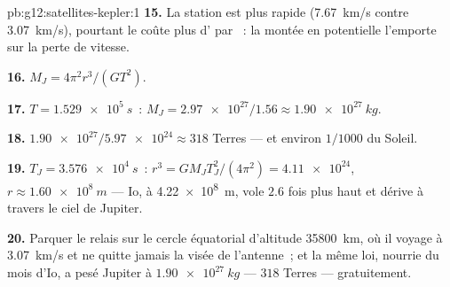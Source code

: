 \begin{solution}{pb:g12:satellites-kepler:1}
\textbf{15.} La station est plus rapide (\qty{7.67}{km/s} contre
\qty{3.07}{km/s}), pourtant le  coûte plus
d' par ~: la montée en
 potentielle l'emporte sur la perte de vitesse.

\textbf{16.} $M_J = 4\pi^2 r^3/(G T^2)$.

\textbf{17.} $T = \qty{1.529e5}{s}$~: $M_J =
\num{2.97e27}/1.56 \approx \qty{1.90e27}{kg}$.

\textbf{18.} $\num{1.90e27}/\num{5.97e24} \approx 318$ Terres ---
et environ $1/1000$ du Soleil.

\textbf{19.} $T_J = \qty{3.576e4}{s}$~: $r^3 = GM_J T_J^2/(4\pi^2) =
\num{4.11e24}$, $r \approx \qty{1.60e8}{m}$ --- Io, à
\qty{4.22e8}{m}, vole $2.6$ fois plus haut et dérive à travers le ciel
de Jupiter.

\textbf{20.} Parquer le relais sur le cercle équatorial d'altitude
\qty{35800}{km}, où il voyage à \qty{3.07}{km/s} et ne quitte jamais
la visée de l'antenne~; et la même loi, nourrie du mois d'Io, a pesé
Jupiter à $\qty{1.90e27}{kg}$ --- $318$ Terres --- gratuitement.
\end{solution}
